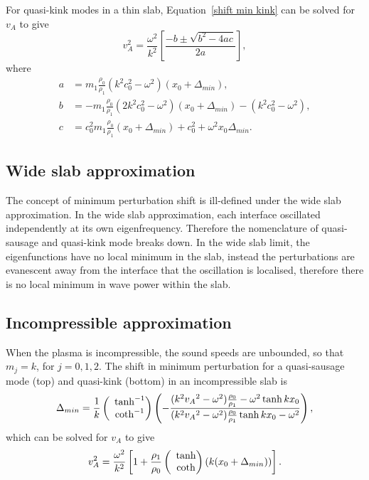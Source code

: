 \documentclass[namedreferences]{solarphysics}
\numberwithin{equation}{section}
\begin{document}
\begin{article}
For quasi-kink modes in a thin slab, Equation~\eqref{shift min kink} can be solved for $v_A$ to give
\begin{equation}
v_A^2 = \frac{\omega^2}{k^2}\left[\frac{-b \pm \sqrt{b^2 - 4ac}}{2a}\right],
\end{equation}
where
\begin{align}
a &= m_1\frac{\rho_0}{\rho_1}(k^2c_0^2 - \omega^2)(x_0 + \Delta_{min}), \\
b &= -m_1\frac{\rho_0}{\rho_1}(2k^2c_0^2 - \omega^2)(x_0 + \Delta_{min}) - (k^2c_0^2 - \omega^2), \\
c &= c_0^2m_1\frac{\rho_0}{\rho_1}(x_0 + \Delta_{min}) + c_0^2 + \omega^2x_0\Delta_{min}.
\end{align}


\subsection{Wide slab approximation}
The concept of minimum perturbation shift is ill-defined under the wide slab approximation. In the wide slab approximation, each interface oscillated independently at its own eigenfrequency. Therefore the nomenclature of quasi-sausage and quasi-kink mode breaks down. In the wide slab limit, the eigenfunctions have no local minimum in the slab, instead the perturbations are evanescent away from the interface that the oscillation is localised, therefore there is no local minimum in wave power within the slab.


\subsection{Incompressible approximation}
When the plasma is incompressible, the sound speeds are unbounded, so that $m_j = k$, for $j = 0, 1, 2$. The shift in minimum perturbation for a quasi-sausage mode (top) and quasi-kink (bottom) in an incompressible slab is
\begin{equation}
\Delta_{min} = \frac{1}{k}\left(\hspace{-0.07in}\begin{matrix} &\tanh^{-1} \\ &\coth^{-1} \end{matrix}\right)\left(-\frac{(k^2{v_A}^2-\omega^2)\frac{\rho_0}{\rho_1} - \omega^2\tanh{kx_0}}{(k^2{v_A}^2-\omega^2)\frac{\rho_0}{\rho_1}\tanh{kx_0} - \omega^2}\right),
\end{equation}
which can be solved for $v_A$ to give
\begin{equation}
v_A^2 = \frac{\omega^2}{k^2}\left[1 + \frac{\rho_1}{\rho_0}\left(\hspace{-0.07in}\begin{matrix} &\tanh \\ &\coth \end{matrix}\right)(k(x_0 + \Delta_{min}))\right].
\end{equation}



\end{article}
\end{document}

